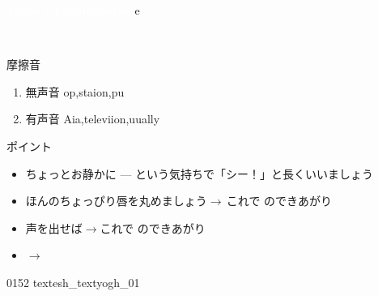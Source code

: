 \documentclass[aspectratio=169, xcolor={dvipsnames,table}]{beamer}
\begin{document}
\begin{frame}
  \hypertarget{today}{}
  \centering
  \textcolor{white}{\Huge\bfseries Today's Pronunciation}e

  \vspace{30pt}

  \textcolor{white}{\Huge\bfseries {}, }


\end{frame}
\begin{frame}[plain,label=slide_textesh_textyogh]{摩擦音}
  \large

  \begin{enumerate}
    \item 無声音 \hspace{20pt}op,\hspace{1\zw}staion,\hspace{1\zw}pu

    \item 有声音 \hspace{20pt}Aia,\hspace{1\zw}televiion,\hspace{1\zw}uually
  \end{enumerate}

  \vspace*{20pt}

  \normalsize ポイント

  \begin{itemize}
    [circle]

    \item ちょっとお静かに --- という気持ちで「シー！」と長くいいましょう

    \item ほんのちょっぴり唇を丸めましょう$\rightarrow$\,これで\,\,のできあがり

    \item 声を出せば$\rightarrow$これで\,\,のできあがり
    \item {} $\longrightarrow$\,\,\, 
  \end{itemize}
  \hfill{\tiny 0152}\,{\scriptsize {}}\,{\tiny textesh\_textyogh\_01}

  \hfill\hyperlink{ex}{}
\end{frame}
\end{document}

